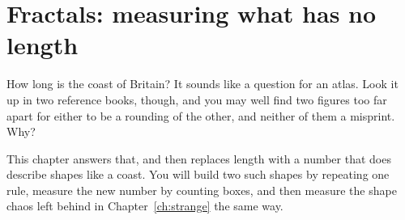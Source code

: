 
\chapter{Fractals: measuring what has no length}
\label{ch:fractals}

\noindent
How long is the coast of Britain? It sounds like a question for an atlas.
Look it up in two reference books, though, and you may well find two figures
too far apart for either to be a rounding of the other, and neither of them
a misprint. Why?

This chapter answers that, and then replaces length with a number that does
describe shapes like a coast. You will build two such shapes by repeating
one rule, measure the new number by counting boxes, and then measure the
shape chaos left behind in Chapter~\ref{ch:strange} the same way.

\begin{outcomes}
\end{outcomes}


